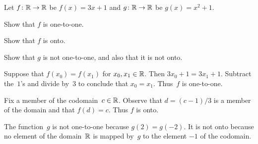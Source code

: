\documentclass{ibl}  %
\begin{document}
\begin{ex} Let $\mbox{$f\colon \mathbb{R}\to \mathbb{R}$}$ be $f(x)=3x+1$ and 
  $\mbox{$g\colon \mathbb{R}\to \mathbb{R}$}$ be $g(x)=x^2+1$.
\begin{exes}
\item Show that $f$ is one-to-one.
\item Show that $f$ is onto.    
\item Show that $g$ is not one-to-one, and also that it is not onto.
\end{exes}
\begin{ans}
\begin{exes}
\item Suppose that $f(x_0)=f(x_1)$ for $x_0,x_1\in\mathbb{R}$.
  Then $3x_0+1=3x_1+1$.
  Subtract the~$1$'s and divide by~$3$ to conclude that $x_0=x_1$.
  Thus~$f$ is one-to-one. 
\item Fix a member of the codomain~$c\in\mathbb{R}$.
  Observe that $d=(c-1)/3$ is a member of the domain and that 
  $f(d)=c$.
  Thus $f$ is onto.
\item The function~$g$ is not one-to-one because $g(2)=g(-2)$.
  It is not onto because no element of the domain~$\mathbb{R}$ is mapped by~$g$
  to the element $-1$ of the codomain.        
\end{exes}
\end{ans}
\end{ex}
\end{document}
